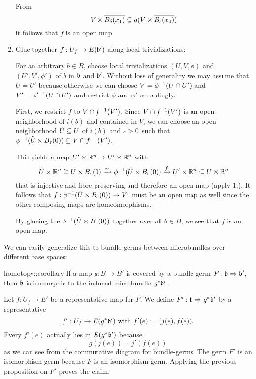 \begin{myproof}
\begin{enumerate}
        From
        \[ V \times \clball[\delta][x_1] \sub g(V \times \clball[\eps][x_0]) \]
        it follows that $f$ is an open map.

        \item Glue together $f: U_f \to E(\mathfrak{b}')$ along local trivializations:

        For an arbitrary $b \in B$, choose local trivializations $(U, V, \phi)$ and $(U', V', \phi')$ of $b$ in $\mathfrak{b}$ and $\mathfrak{b}'$.
        Without loss of generality we may assume that $U = U'$ because otherwise we can choose $V = \phi^{-1}(U \cap U')$ and $V' = \phi'^{-1}(U \cap U')$
        and restrict $\phi$ and $\phi'$ accordingly.   
        
        First, we restrict $f$ to $V \cap f^{-1}(V')$. Since $V \cap f^{-1}(V')$ is an open neighborhood of $i(b)$ and contained in $V$, we can choose
        an open neighborhood $\tilde{U} \subseteq{} U$ of $i(b)$ and $\varepsilon{} > 0$ such that $\inv{\phi}(\tilde{U} \times \ball[\eps]) \sub V \cap \inv{f}(V')$.
        
        This yields a map $U' \times \mathbb{R}^n \to U' \times \mathbb{R}^n$ with
        \[ \tilde{U} \times \R^n \cong  \tilde{U} \times \ball[\eps] \isomto \inv{\phi}(\tilde{U} \times \ball[\eps]) \xto{f} U' \times \R^n \sub U \times \R^n \]
        that is injective and fibre-preserving and therefore an open map (apply 1.).
        It follows that $f: \inv{\phi}(\tilde{U} \times \ball[\eps]) \to V'$ must be an open map as well since the other composing maps are homeomorphisms.

        By glueing the $\inv{\phi}(\tilde{U} \times \ball[\eps])$ together over all $b \in B$, we see that $f$ is an open map.
    \end{enumerate}
\end{myproof}

\begin{myparagraph}
    We can easily generalize this to bundle-germs between microbundles over different base spaces:
\end{myparagraph}

\begin{mycorollary}{homotopy::corollary}
    If a map $g: B \to B'$ is covered by a bundle-germ $F: \mathfrak{b} \Rightarrow{} \mathfrak{b}'$, then $\mathfrak{b}$ is isomorphic to the induced microbundle $g^*\mathfrak{b}'$.
\end{mycorollary}
\begin{myproof}
    Let $f: U_f \to E'$ be a representative map for $F$.
    We define $F': \mathfrak{b} \Rightarrow{} g^*\mathfrak{b}'$ by a representative
    \[ f': U_f \to E(g^*\mathfrak{b}') \text{ with } f'(e) := (j(e), f(e)). \]
    Every $f'(e)$ actually lies in $E(g^*\mathfrak{b}')$ because
    \[ g(j(e)) = j'(f(e)) \]
    as we can see from the commutative diagram for bundle-germs.
    The germ $F'$ is an isomorphism-germ because $F$ is an isomorphism-germ.
    Applying the previous proposition on $F'$ proves the claim.
\end{myproof}